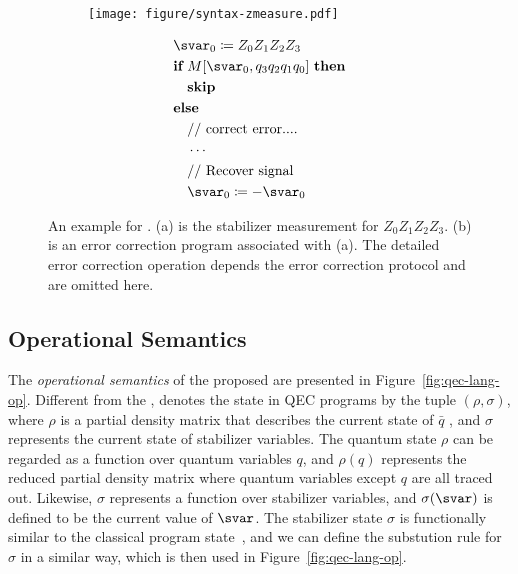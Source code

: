 \begin{figure}
    \centering
    \begin{subfigure}[b]{0.25\textwidth}
         \centering
         \texttt{[image: figure/syntax-zmeasure.pdf]}%
         \subcaption{}
    \end{subfigure}
    \begin{subfigure}[b]{0.20\textwidth}
    \begingroup \fontsize{\myfontsize}{\mylinesize}
    \addtolength{\jot}{-4pt}
    \begin{align*}
        & \svar_0 \coloneqq Z_{0}Z_{1}Z_{2}Z_{3} \\ 
        & \textbf{if}\ M[\svar_0, q_3q_2q_1q_0]\ \textbf{then} \\
        & \quad \textbf{skip} \\
        & \textbf{else} \\
        & \quad \text{// correct error....}\\
        & \quad \cdots \\
        & \quad \text{// Recover signal} \\
        & \quad \svar_0 \coloneqq -\svar_0\ 
    \end{align*}%
    \endgroup
    \subcaption{}
    \end{subfigure}
    \caption{An example for {\langname}. 
    (a) is the stabilizer measurement for $Z_{0}Z_{1}Z_{2}Z_{3}$. (b) is an error correction program associated with (a). The detailed error correction operation depends the error correction protocol and are omitted here.  
        }
    \label{fig:one-stabilizer}%
\end{figure}





\subsection{Operational Semantics}\label{subsect:operational}

The \textit{operational semantics} of the proposed {\langname} are presented in Figure~\ref{fig:qec-lang-op}.
Different from the \qwhilelang, {\langname} denotes the state in QEC programs by the tuple $(\rho, \sigma)$, where $\rho$ is a partial density matrix that describes the current state of $\bar{q}$ , and $\sigma$ represents the current state of stabilizer variables. 
The quantum state $\rho$ can be regarded as a function over quantum variables $q$, and $\rho(q)$ represents the reduced partial density matrix where quantum variables except $q$ are all traced out.
Likewise, $\sigma$ represents a function over stabilizer variables, and $\sigma(\svar)$ is defined to be the current value of $\svar$.
The stabilizer state $\sigma$ is functionally similar to the classical program state~\cite{Winskel1993TheFS}, and 
we can define the substution rule for $\sigma$ in a similar way, which is then used in Figure~\ref{fig:qec-lang-op}.

